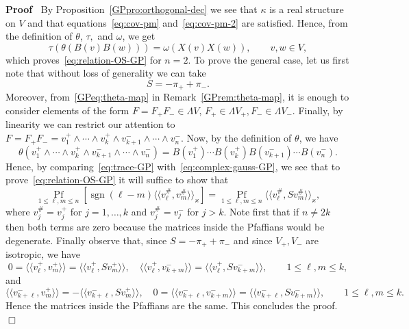 \documentclass[11pt]{article}
\newcommand{\llangle}{{\langle\!\langle}}
\newcommand{\rrangle}{{\rangle\!\rangle}}
\newcommand{\tmop}[1]{\ensuremath{\operatorname{#1}}}
\newenvironment{proof}{\noindent\textbf{Proof\ }}{\hspace*{\fill}$\Box$\medskip}
\begin{document}
\begin{proof}
  By Proposition~\ref{GPpro:orthogonal-dec} we see that $\kappa$ is a real
  structure on $V$ and that equations~{\eqref{eq:cov-pm}}
  and~{\eqref{eq:cov-pm-2}} are satisfied. Hence, from the definition of
  $\theta$, $\tau,$ and $\omega$, we get
  \[ \tau (\theta (B (v) B (w))) = \omega (X (v) X (w)), \qquad v, w \in V, \]
  which proves~{\eqref{eq:relation-OS-GP}} for $n = 2$. To prove the general
  case, let us first note that without loss of generality we can take
  \[ S = - \pi_+ + \pi_- . \]
  Moreover, from~{\eqref{GPeq:theta-map}} in Remark~\ref{GPrem:theta-map}, it
  is enough to consider elements of the form $F = F_+ F_- \in \Lambda V$, $F_+
  \in \Lambda V_+, F_- \in \Lambda V_-$. Finally, by linearity we can restrict
  our attention to $F = F_+ F_- = v_1^+ \wedge \cdots \wedge v_k^+ \wedge v_{k
  + 1}^- \wedge \cdots \wedge v_n^-$. Now, by the definition of $\theta$, we
  have
  \[ \theta (v_1^+ \wedge \cdots \wedge v_k^+ \wedge v_{k + 1}^- \wedge \cdots
     \wedge v_n^-) = B (v_1^+) \cdots B (v_k^+) B (v^-_{k + 1}) \cdots B
     (v_n^-) . \]
  Hence, by comparing~{\eqref{eq:trace-GP}}
  with~{\eqref{eq:complex-gauss-GP}}, we see that to
  prove~{\eqref{eq:relation-OS-GP}} it will suffice to show that
  \[ \underset{1 \leqslant \ell, m \leqslant n}{\tmop{Pf}} [\tmop{sgn} (\ell
     - m) \llangle v^{\#}_{\ell}, v^{\#}_m \rrangle_{\varkappa}] = \underset{1
     \leqslant \ell, m \leqslant n}{\tmop{Pf}} \llangle v^{\#}_{\ell}, S
     v^{\#}_m \rrangle_{\varkappa}, \]
  where $v_j^{\#} = v_j^+$ for $j = 1, \ldots, k$ and $v^{\#}_j = v_j^-$ for
  $j > k$. Note first that if $n \neq 2 k$ then both terms are zero because
  the matrices inside the Pfaffians would be degenerate. Finally observe that,
  since $S = - \pi_+ + \pi_-$ and since $V_+, V_-$ are isotropic, we have
  \[ 0 = \llangle v^+_{\ell}, v^+_m \rrangle = \llangle v^+_{\ell}, S v^+_m
     \rrangle, \quad \llangle v^+_{\ell}, v^-_{k + m} \rrangle = \llangle
     v^+_{\ell}, S v^-_{k + m} \rrangle, \qquad 1 \leqslant \ell, m \leqslant
     k, \]
  and
  \[ \llangle v^-_{k + \ell}, v^+_m \rrangle = - \llangle v^-_{k + \ell}, S
     v^+_m \rrangle, \quad 0 = \llangle v^-_{k + \ell}, v^-_{k + m} \rrangle =
     \llangle v^-_{k + \ell}, S v^-_{k + m} \rrangle, \qquad 1 \leqslant \ell,
     m \leqslant k. \]
  Hence the matrices inside the Pfaffians are the same. This concludes the
  proof.
\end{proof}
\end{document}
